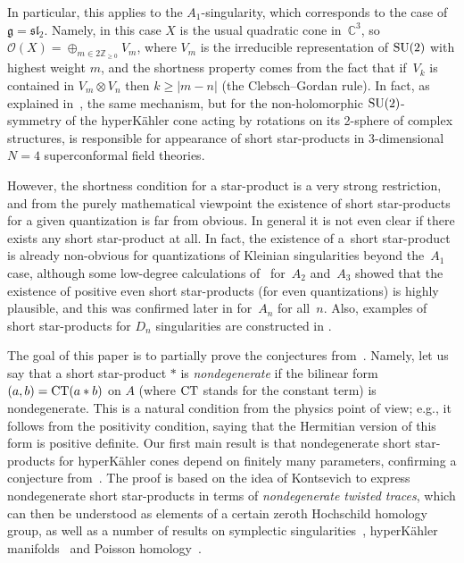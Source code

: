 \documentclass[pdftex]{sigma}
\numberwithin{equation}{section}
\begin{document}
In particular, this applies to the $A_1$-singularity, which corresponds to the case of $\mathfrak g=\mathfrak{sl}_2$. Namely, in this case $X$ is the usual quadratic cone in~${\mathbb C}^3$, so $\mathcal O(X)=\oplus_{m\in 2{\mathbb Z}_{\ge 0}}V_m$, where $V_m$ is the irreducible representation of ${\rm SU}(2)$ with highest weight $m$, and the shortness property comes from the fact that if~$V_k$ is contained
in $V_m\otimes V_n$ then $k\ge |m-n|$ (the Clebsch--Gordan rule). In fact, as explained in~\cite{BPR}, the same mechanism, but for the non-holomorphic ${\rm SU}(2)$-symmetry of the hyperK\"ahler cone acting by rotations on its 2-sphere of complex structures, is responsible for appearance of short star-products in 3-dimensional $N=4$ superconformal field theories.

However, the shortness condition for a star-product is a very strong restriction, and from the purely mathematical viewpoint the existence of short star-products for a given quantization is far from obvious. In general it is not even clear if there exists any short star-product at all. In fact, the existence of a~short star-product is already non-obvious for quantizations of Kleinian singularities beyond the~$A_1$ case, although some low-degree calculations of~\cite{BPR} for~$A_2$ and~$A_3$ showed that the existence of positive even short star-products (for even quantizations) is highly plausible, and this was confirmed later in \cite{DFPY1, DPY} for~$A_n$ for all~$n$. Also, examples of short star-products for $D_n$ singularities are constructed in \cite[Section~5.2.1]{DFPY2}.

The goal of this paper is to partially prove the conjectures from~\cite{BPR}.
Namely, let us say that a short star-product $*$ is {\it nondegenerate}
if the bilinear form $(a,b)={\rm CT}(a*b)$ on $A$ (where ${\rm CT}$ stands for the constant term)
 is nondegenerate. This is a natural condition from the physics point of view; e.g.,
it follows from the positivity condition, saying that the Hermitian version of this form is positive definite. Our first main result is that nondegenerate short star-products for hyperK\"ahler cones depend on finitely many parameters, confirming a conjecture from~\cite{BPR}.
The proof is based on the idea of Kontsevich to express nondegenerate short star-products in terms of {\it nondegenerate twisted traces}, which can then be understood as elements of a certain zeroth Hochschild homology group, as well as a number of results on symplectic singularities~\cite{Ka,L2,Na3}, hyperK\"ahler manifolds~\cite{HKLR} and Poisson homology~\cite{ES}.
\end{document}

